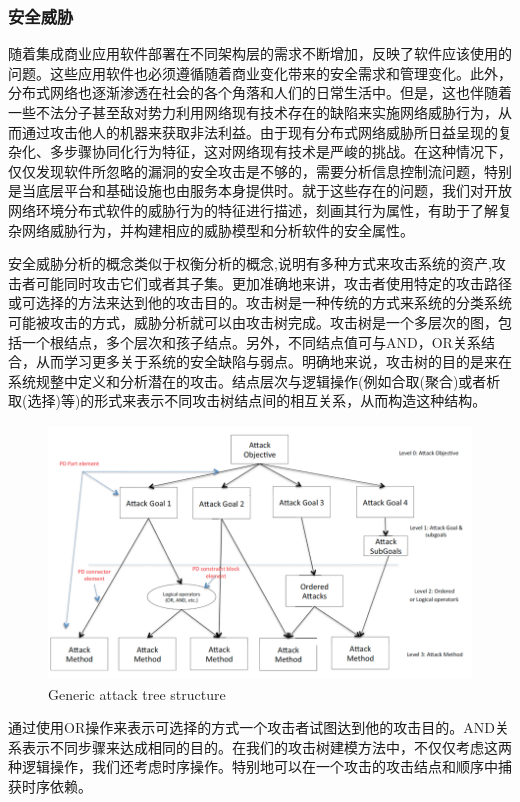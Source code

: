 \subsubsection{安全威胁}
\par
随着集成商业应用软件部署在不同架构层的需求不断增加，反映了软件应该使用的问题。这些应用软件也必须遵循随着商业变化带来的安全需求和管理变化。此外，分布式网络也逐渐渗透在社会的各个角落和人们的日常生活中。但是，这也伴随着一些不法分子甚至敌对势力利用网络现有技术存在的缺陷来实施网络威胁行为，从而通过攻击他人的机器来获取非法利益。由于现有分布式网络威胁所日益呈现的复杂化、多步骤协同化行为特征，这对网络现有技术是严峻的挑战。在这种情况下，仅仅发现软件所忽略的漏洞的安全攻击是不够的，需要分析信息控制流问题，特别是当底层平台和基础设施也由服务本身提供时。就于这些存在的问题，我们对开放网络环境分布式软件的威胁行为的特征进行描述，刻画其行为属性，有助于了解复杂网络威胁行为，并构建相应的威胁模型和分析软件的安全属性。
\par
安全威胁分析的概念类似于权衡分析的概念,说明有多种方式来攻击系统的资产,攻击者可能同时攻击它们或者其子集。更加准确地来讲，攻击者使用特定的攻击路径或可选择的方法来达到他的攻击目的。攻击树是一种传统的方式来系统的分类系统可能被攻击的方式，威胁分析就可以由攻击树完成。攻击树是一个多层次的图，包括一个根结点，多个层次和孩子结点。另外，不同结点值可与AND，OR关系结合，从而学习更多关于系统的安全缺陷与弱点。明确地来说，攻击树的目的是来在系统规整中定义和分析潜在的攻击。结点层次与逻辑操作(例如合取(聚合)或者析取(选择)等)的形式来表示不同攻击树结点间的相互关系，从而构造这种结构。
\par
\begin{figure}[h]
	\centering
	\includegraphics[width=12cm,height=6.75cm]{imgs/attacktree.png}
	\caption{Generic attack tree structure}
	\label{architecture}
\end{figure}
\par
通过使用OR操作来表示可选择的方式一个攻击者试图达到他的攻击目的。AND关系表示不同步骤来达成相同的目的。在我们的攻击树建模方法中，不仅仅考虑这两种逻辑操作，我们还考虑时序操作。特别地可以在一个攻击的攻击结点和顺序中捕获时序依赖。
